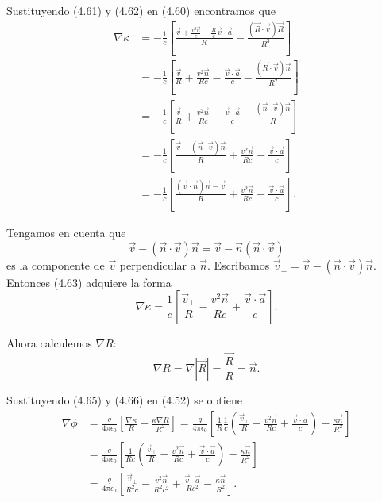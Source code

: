 \documentclass[12pt,a4paper]{book}
\begin{document}
Sustituyendo (4.61) y (4.62) en (4.60) encontramos que
\begin{align}
\nabla\kappa &= -\frac{1}{c}\left[\frac{\vec{v} + \frac{v^2\vec{n}}{c} - \frac{R}{c}\vec{v} \cdot \vec{a}}{R} - \frac{(\vec{R} \cdot \vec{v})\vec{R}}{R^3}\right] \nonumber \\
&= -\frac{1}{c}\left[\frac{\vec{v}}{R} + \frac{v^2\vec{n}}{Rc} - \frac{\vec{v} \cdot \vec{a}}{c} - \frac{(\vec{R} \cdot \vec{v})\vec{n}}{R^2}\right] \nonumber \\
&= -\frac{1}{c}\left[\frac{\vec{v}}{R} + \frac{v^2\vec{n}}{Rc} - \frac{\vec{v} \cdot \vec{a}}{c} - \frac{(\vec{n} \cdot \vec{v})\vec{n}}{R}\right] \nonumber \\
&= -\frac{1}{c}\left[\frac{\vec{v} - (\vec{n} \cdot \vec{v})\vec{n}}{R} + \frac{v^2\vec{n}}{Rc} - \frac{\vec{v} \cdot \vec{a}}{c}\right] \nonumber \\
&= -\frac{1}{c}\left[\frac{(\vec{v} \cdot \vec{n})\vec{n} - \vec{v}}{R} + \frac{v^2\vec{n}}{Rc} - \frac{\vec{v} \cdot \vec{a}}{c}\right].
\end{align}

Tengamos en cuenta que
\begin{equation}
\vec{v} - (\vec{n} \cdot \vec{v})\vec{n} = \vec{v} - \vec{n}(\vec{n} \cdot \vec{v})
\end{equation}
es la componente de $\vec{v}$ perpendicular a $\vec{n}$. Escribamos $\vec{v}_{\perp} = \vec{v} - (\vec{n} \cdot \vec{v})\vec{n}$. Entonces (4.63) adquiere la forma
\begin{equation}
\nabla\kappa = \frac{1}{c}\left[\frac{\vec{v}_{\perp}}{R} - \frac{v^2\vec{n}}{Rc} + \frac{\vec{v} \cdot \vec{a}}{c}\right].
\end{equation}

Ahora calculemos $\nabla R$:
\begin{equation}
\nabla R = \nabla|\vec{R}| = \frac{\vec{R}}{R} = \vec{n}.
\end{equation}

Sustituyendo (4.65) y (4.66) en (4.52) se obtiene
\begin{align}
\nabla\phi &= \frac{q}{4\pi\epsilon_0}\left[\frac{\nabla\kappa}{R} - \frac{\kappa\nabla R}{R^2}\right] = \frac{q}{4\pi\epsilon_0}\left[\frac{1}{R}\frac{1}{c}\left(\frac{\vec{v}_{\perp}}{R} - \frac{v^2\vec{n}}{Rc} + \frac{\vec{v} \cdot \vec{a}}{c}\right) - \frac{\kappa\vec{n}}{R^2}\right] \nonumber \\
&= \frac{q}{4\pi\epsilon_0}\left[\frac{1}{Rc}\left(\frac{\vec{v}_{\perp}}{R} - \frac{v^2\vec{n}}{Rc} + \frac{\vec{v} \cdot \vec{a}}{c}\right) - \frac{\kappa\vec{n}}{R^2}\right] \nonumber \\
&= \frac{q}{4\pi\epsilon_0}\left[\frac{\vec{v}_{\perp}}{R^2c} - \frac{v^2\vec{n}}{R^2c^2} + \frac{\vec{v} \cdot \vec{a}}{Rc^2} - \frac{\kappa\vec{n}}{R^2}\right].
\end{align}
\end{document}
